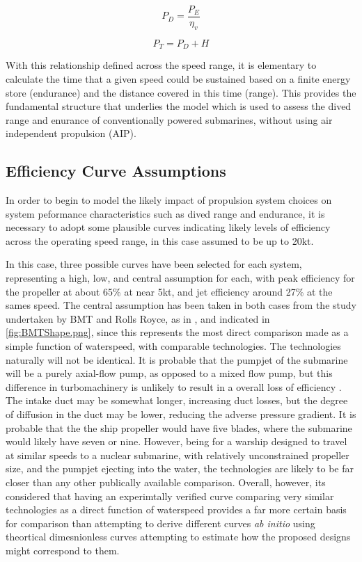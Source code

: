 \documentclass{article}\usepackage[]{graphicx}\usepackage[]{color}
\begin{document}
\begin{equation}
\label{eq:powerdrawn}
P_D = \frac{P_E}{\eta_v}
\end{equation}

\begin{equation}
\label{eq:totalpower}
P_T = P_D + H
\end{equation}

With this relationship defined across the speed range, it is elementary to calculate the time that a given speed could be sustained based on a finite energy store (endurance) and the distance covered in this time (range).  This provides the fundamental structure that underlies the model which is used to assess the dived range and enurance of conventionally powered submarines, without using air independent propulsion (AIP).

\subsection{Efficiency Curve Assumptions}

In order to begin to model the likely impact of propulsion system choices on system peformance characteristics such as dived range and endurance, it is necessary to adopt some plausible curves indicating likely levels of efficiency across the operating speed range, in this case assumed to be up to 20kt.

In this case, three possible curves have been selected for each system, representing a high, low, and central assumption for each, with peak efficiency for the propeller at about 65\% at near 5kt, and jet efficiency around 27\% at the sames speed.  The central assumption has been taken in both cases from the study undertaken by BMT and Rolls Royce, as in \cite{giles2010}, and indicated in \ref{fig:BMTShape.png}, since this represents the most direct comparison made as a simple function of waterspeed, with comparable technologies.  The technologies naturally will not be identical.  It is probable that the pumpjet of the submarine will be a purely axial-flow pump, as opposed to a mixed flow pump, but this difference in turbomachinery is unlikely to result in a overall loss of efficiency \parencite{hamilton1997}.  The intake duct may be somewhat longer, increasing duct losses, but the degree of diffusion in the duct may be lower, reducing the adverse pressure gradient.  It is probable that the the ship propeller would have five blades, where the submarine would likely have seven or nine. However, being  for a warship designed to travel at similar speeds to a nuclear submarine, with relatively unconstrained propeller size, and the pumpjet ejecting into the water, the technologies are likely to be far closer than any other publically available comparison. Overall, however, its considered that having an experimtally verified curve comparing very similar technologies as a direct function of waterspeed provides a far more certain basis for comparison than attempting to derive different curves \textit{ab initio} using theortical dimesnionless curves attempting to estimate how the proposed designs might correspond to them.
\end{document}
